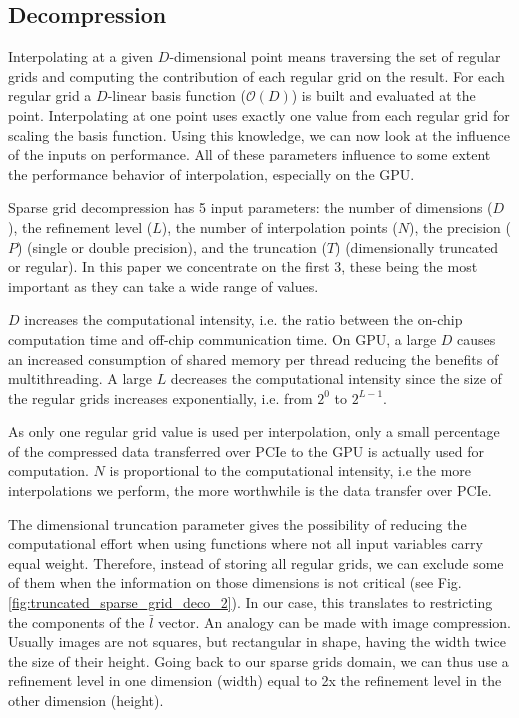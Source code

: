 \subsection{Decompression}

Interpolating at a given $D$-dimensional point means traversing the set of
regular grids and computing the contribution of each regular grid on the result. For
each regular grid a $D$-linear basis function ($\mathcal{O}(D)$) is built and
evaluated at the point. Interpolating at one point uses exactly one value from each
regular grid for scaling the basis function. Using this knowledge, we can now
look at the influence of the inputs on performance. All of these parameters
influence to some extent the performance behavior of interpolation, especially
on the GPU.

Sparse grid decompression has 5 input parameters: the number of dimensions
($D$), the refinement level ($L$), the number of interpolation points ($N$), the
precision ($P$) (single or double precision), and the truncation ($T$)
(dimensionally truncated or regular). In this paper we concentrate on the first
3, these being the most important as they can take a wide range of values.

$D$ increases the computational intensity, i.e. the ratio between the on-chip
computation time and off-chip communication time. On GPU, a large $D$ causes an
increased consumption of shared memory per thread reducing the benefits of
multithreading. A large $L$ decreases the computational intensity since the size
of the regular grids increases exponentially, i.e. from $2^0$ to $2^{L-1}$. 

As only one regular grid value is used per interpolation, only a small
percentage of the compressed data transferred over PCIe to the GPU is actually
used for computation. $N$ is proportional to the computational intensity, i.e
the more interpolations we perform, the more worthwhile is the data transfer over
PCIe.

The dimensional truncation parameter gives the possibility of reducing the
computational effort when using functions where not all input variables carry
equal weight. Therefore, instead of storing all regular grids, we can exclude
some of them when the information on those dimensions is not critical (see Fig.
\ref{fig:truncated_sparse_grid_deco_2}). In our case, this translates to
restricting the components of the $\bar{l}$ vector. An analogy can be made with
image compression. Usually images are not squares, but rectangular in shape,
having the width twice the size of their height. Going back to our sparse grids
domain, we can thus use a refinement level in one dimension (width) equal to 2x
the refinement level in the other dimension (height).

